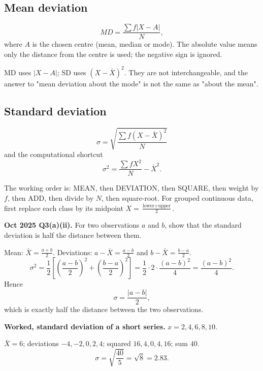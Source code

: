 \documentclass[11pt,a4paper]{article}
\begin{document}
\subsection{Mean deviation}
\[
MD=\frac{\sum f|X-A|}{N},
\]
where $A$ is the chosen centre (mean, median or mode). The absolute value means only the distance from the centre is used; the negative sign is ignored.

\begin{dangerbox}
MD uses $|X-A|$; SD uses $(X-\bar X)^2$. They are not interchangeable, and the answer to "mean deviation about the mode" is not the same as "about the mean".
\end{dangerbox}

\subsection{Standard deviation}
\[
\boxed{\sigma=\sqrt{\frac{\sum f(X-\bar X)^2}{N}}}
\]
and the computational shortcut
\[
\boxed{\sigma^2=\frac{\sum fX^2}{N}-\bar X^2}.
\]

\begin{rememberbox}
The working order is: MEAN, then DEVIATION, then SQUARE, then weight by $f$, then ADD, then divide by $N$, then square-root. For grouped continuous data, first replace each class by its midpoint $X=\frac{\text{lower}+\text{upper}}{2}$.
\end{rememberbox}

\begin{pyqbox}
\textbf{Oct 2025 Q3(a)(ii).} For two observations $a$ and $b$, show that the standard deviation is half the distance between them.
\end{pyqbox}

\begin{solbox}
Mean: $\bar X=\frac{a+b}{2}$.
Deviations: $a-\bar X=\frac{a-b}{2}$ and $b-\bar X=\frac{b-a}{2}$.
\[
\sigma^2=\frac{1}{2}\left[\left(\frac{a-b}{2}\right)^2+\left(\frac{b-a}{2}\right)^2\right]
=\frac{1}{2}\cdot 2\cdot\frac{(a-b)^2}{4}=\frac{(a-b)^2}{4}.
\]
Hence
\[
\boxed{\sigma=\frac{|a-b|}{2}},
\]
which is exactly half the distance between the two observations.
\end{solbox}

\begin{exambox}
\textbf{Worked, standard deviation of a short series.} $x=2,4,6,8,10$.

$\bar X=6$; deviations $-4,-2,0,2,4$; squared $16,4,0,4,16$; sum $40$.
\[
\sigma=\sqrt{\frac{40}{5}}=\sqrt8=2.83.
\]
\end{exambox}
\end{document}
